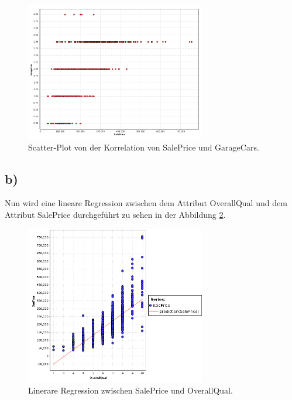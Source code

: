 \begin{figure}
  \centering
  \includegraphics[width=0.7\textwidth]{GarageCars.png}
  \caption{Scatter-Plot von der Korrelation von SalePrice
  und GarageCars.}
  \label{fig:3}
\end{figure}

\FloatBarrier
\subsection{b)}
\label{subsec:a1b}

Nun wird eine lineare Regression zwischen dem Attribut OverallQual
und dem Attribut SalePrice durchgeführt zu sehen in der Abbildung
\ref{fig:linreg}.
\FloatBarrier


\begin{figure}
  \centering
  \includegraphics[width=0.7\textwidth]{Aufgabe_b.png}
  \caption{Linerare Regression zwischen SalePrice und OverallQual.}
  \label{fig:linreg}
\end{figure}

\FloatBarrier

